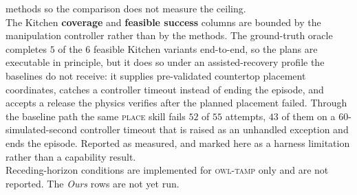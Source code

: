 \begin{table}[t]
\begin{minipage}{0.98\textwidth}
methods so the comparison does not measure the ceiling.
\\[2pt]
The Kitchen \textbf{coverage} and \textbf{feasible success} columns are
bounded by the manipulation controller rather than by the methods. The
ground-truth oracle completes $5$ of the $6$ feasible Kitchen variants
end-to-end, so the plans are executable in principle, but it does so under an
assisted-recovery profile the baselines do not receive: it supplies
pre-validated countertop placement coordinates, catches a controller timeout
instead of ending the episode, and accepts a release the physics verifies
after the planned placement failed. Through the baseline path the same
\textsc{place} skill fails $52$ of $55$ attempts, $43$ of them on a $60$-simulated-second
controller timeout that is raised as an unhandled exception and ends the
episode. Reported as measured, and marked here as a harness limitation rather
than a capability result.
\\[2pt]
Receding-horizon conditions are implemented for \textsc{owl-tamp} only and are
not reported. The \emph{Ours} rows are not yet run.
\end{minipage}
\end{table}
